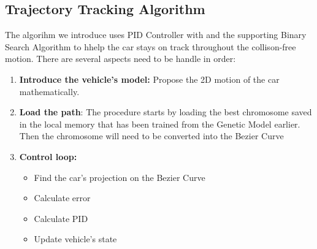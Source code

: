   \subsection{Trajectory Tracking Algorithm}
  The algorihm we introduce uses PID Controller with and the supporting Binary Search Algorithm to hhelp the car stays on track throughout the collison-free motion.
  There are several aspects need to be handle in order:
  \begin{enumerate}
    \item \textbf{Introduce the vehicle's model:} Propose the 2D motion of the car mathematically.
    \item \textbf{Load the path}: The procedure starts by loading the best chromosome saved in the local memory that has been trained from the Genetic Model earlier.
      Then the chromosome will need to be converted into the Bezier Curve
    \item \textbf{Control loop:}
      \begin{itemize}
        \item Find the car's projection on the Bezier Curve
        \item Calculate error
        \item Calculate PID
        \item Update vehicle's state
      \end{itemize}
  \end{enumerate}

